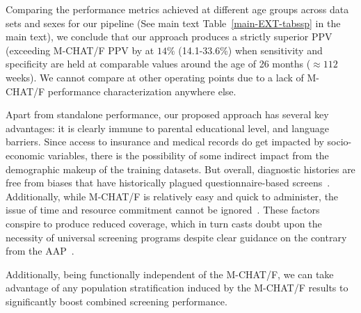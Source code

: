 \documentclass[onecolumn,,10pt]{IEEEtran}
\begin{document}
Comparing the performance metrics achieved at different age groups across data sets and sexes for our pipeline (See main text  Table~\ref{main-EXT-tabssp} in the main text), we conclude that our approach produces a strictly superior PPV (exceeding M-CHAT/F PPV by at  $14\%$ (14.1-33.6\%) when sensitivity and specificity are held at comparable values around the age of 26 months ($\approx 112$ weeks). We cannot compare at other operating points due to a lack of M-CHAT/F performance characterization anywhere else.

Apart from standalone performance, our proposed approach has several key advantages: it is clearly immune to parental educational level, and language barriers. Since access to insurance and medical records do get impacted by socio-economic variables, there is the possibility of some indirect impact from the demographic makeup of the training datasets. But overall, diagnostic histories are free from biases that have historically plagued questionnaire-based screens~\cite{hyman2020identification}. Additionally, while M-CHAT/F is relatively easy and quick to administer, the issue of time and resource commitment cannot be ignored~\cite{hyman2020identification}. These factors conspire  to produce reduced  coverage, which in turn  casts  doubt upon the necessity of universal screening programs despite clear guidance on the contrary from the AAP~\cite{pmid31562252}. 

Additionally, being functionally independent of the M-CHAT/F, we can take advantage of any population stratification induced by the M-CHAT/F results to significantly boost combined screening performance.

\end{document}
